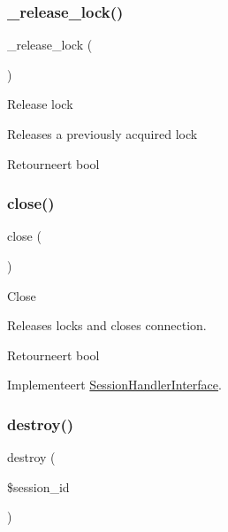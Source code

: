 \subsubsection{\texorpdfstring{\_release\_lock()}{\_release\_lock()}}
{\footnotesize\ttfamily \+\_\+release\+\_\+lock (\begin{DoxyParamCaption}{ }\end{DoxyParamCaption})\hspace{0.3cm}{\ttfamily [protected]}}

Release lock

Releases a previously acquired lock

\begin{DoxyReturn}{Retourneert}
bool 
\end{DoxyReturn}
\mbox{\label{class_c_i___session__redis__driver_aa69c8bf1f1dcf4e72552efff1fe3e87e}} 
\subsubsection{\texorpdfstring{close()}{close()}}
{\footnotesize\ttfamily close (\begin{DoxyParamCaption}{ }\end{DoxyParamCaption})}

Close

Releases locks and closes connection.

\begin{DoxyReturn}{Retourneert}
bool 
\end{DoxyReturn}


Implementeert \mbox{\hyperlink{interface_session_handler_interface}{Session\+Handler\+Interface}}.

\mbox{\label{class_c_i___session__redis__driver_aaec5812f6b4eb6835f88d3baa06a002a}} 
\subsubsection{\texorpdfstring{destroy()}{destroy()}}
{\footnotesize\ttfamily destroy (\begin{DoxyParamCaption}\item[{}]{\$session\+\_\+id }\end{DoxyParamCaption})}

